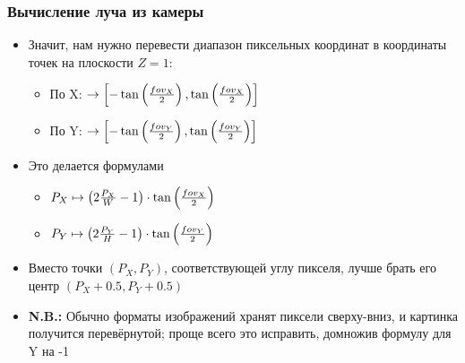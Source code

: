 \documentclass[10pt]{beamer}
\begin{document}
\begin{frame}
\frametitle{Вычисление луча из камеры}
\begin{itemize}
\item Значит, нам нужно перевести диапазон пиксельных координат в координаты точек на плоскости \begin{math}Z=1\end{math}:
\begin{itemize}
\item По X: \begin{math}[0, W]\rightarrow\left[-\tan\left({fov_X\over 2}\right), \tan\left({fov_X\over 2}\right)\right]\end{math}
\item По Y: \begin{math}[0, H]\rightarrow\left[-\tan\left({fov_Y\over 2}\right), \tan\left({fov_Y\over 2}\right)\right]\end{math}
\end{itemize}
\pause
\item Это делается формулами
\begin{itemize}
\item \begin{math}P_X \mapsto \left(2 \frac{P_X}{W} - 1\right) \cdot \tan\left({fov_X\over 2}\right)\end{math}
\item \begin{math}P_Y \mapsto \left(2 \frac{P_Y}{H} - 1\right) \cdot \tan\left({fov_Y\over 2}\right)\end{math}
\end{itemize}
\pause
\item Вместо точки \begin{math}(P_X, P_Y)\end{math}, соответствующей углу пикселя, лучше брать его центр \begin{math}(P_X + 0.5, P_Y + 0.5)\end{math}
\item \alert{\textbf{N.B.:}} Обычно форматы изображений хранят пиксели сверху-вниз, и картинка получится перевёрнутой; проще всего это исправить, домножив формулу для Y на -1
\end{itemize}
\end{frame}
\end{document}
